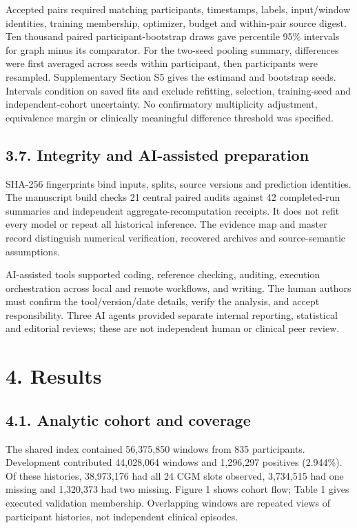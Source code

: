 \documentclass[11pt,a4paper]{article}
\begin{document}
Accepted pairs required matching participants, timestamps, labels, input/window identities, training membership, optimizer, budget and within-pair source digest. Ten thousand paired participant-bootstrap draws gave percentile 95\% intervals for graph minus its comparator. For the two-seed pooling summary, differences were first averaged across seeds within participant, then participants were resampled. Supplementary Section S5 gives the estimand and bootstrap seeds. Intervals condition on saved fits and exclude refitting, selection, training-seed and independent-cohort uncertainty. No confirmatory multiplicity adjustment, equivalence margin or clinically meaningful difference threshold was specified.

\subsection*{3.7. Integrity and AI-assisted preparation}
SHA-256 fingerprints bind inputs, splits, source versions and prediction identities. The manuscript build checks 21 central paired audits against 42 completed-run summaries and independent aggregate-recomputation receipts. It does not refit every model or repeat all historical inference. The evidence map and master record distinguish numerical verification, recovered archives and source-semantic assumptions.

AI-assisted tools supported coding, reference checking, auditing, execution orchestration across local and remote workflows, and writing. The human authors must confirm the tool/version/date details, verify the analysis, and accept responsibility. Three AI agents provided separate internal reporting, statistical and editorial reviews; these are not independent human or clinical peer review.

\section*{4. Results}
\subsection*{4.1. Analytic cohort and coverage}
The shared index contained 56,375,850 windows from 835 participants. Development contributed 44,028,064 windows and 1,296,297 positives (2.944\%). Of these histories, 38,973,176 had all 24 CGM slots observed, 3,734,515 had one missing and 1,320,373 had two missing. Figure 1 shows cohort flow; Table 1 gives executed validation membership. Overlapping windows are repeated views of participant histories, not independent clinical episodes.
\end{document}
